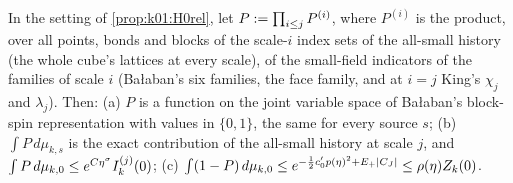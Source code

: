 \begin{theorem}\label{thm:a01:R0}
In the setting of \cref{prop:k01:H0rel}, let $P:=\prod_{i\le j}P^{(i)}$, where $P^{(i)}$ is the product, over all points, bonds and blocks of the scale-$i$ index sets of the all-small history (the whole cube's lattices at every scale), of the small-field indicators of the families of scale $i$ (Ba{\l}aban's six families, the face family, and at $i=j$ King's $\chi_j$ and $\lambda_j$). Then: (a) $P$ is a function on the joint variable space of Ba{\l}aban's block-spin representation with values in $\{0,1\}$, the same for every source $s$; (b) $\int P\,d\mu_{k,s}$ is the exact contribution of the all-small history at scale $j$, and $\int P\,d\mu_{k,0}\le e^{C\eta^\sigma}I^{(j)}_{k}(0)$; (c) $\int(1-P)\,d\mu_{k,0}\le e^{-\frac12c_0'p(\eta)^2+E_+|C_J|}\le\rho(\eta)Z_{k}(0)$.
\end{theorem}
